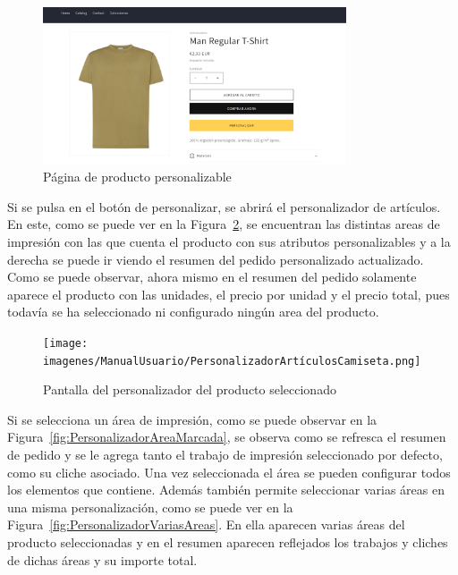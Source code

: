 \documentclass[12pt]{article}
\begin{document}
\begin{figure}[ht]
    \centering
    \includegraphics[width=0.8\textwidth]{imagenes/ManualUsuario/PaginaProductoConPersonalizacion.png}
    \caption{\label{fig:ProductoPersonalizable}Página de producto personalizable}
    \vspace{\fill}
\end{figure}

Si se pulsa en el botón de personalizar, se abrirá el personalizador de artículos. En este, como se puede ver en la Figura~\ref{fig:Personalizador}, se encuentran
las distintas areas de impresión con las que cuenta el producto con sus atributos personalizables y a la derecha se puede ir viendo el resumen del pedido personalizado actualizado.
Como se puede observar, ahora mismo en el resumen del pedido solamente aparece el producto con las unidades, el precio por unidad y el precio total, pues todavía se ha seleccionado ni configurado
ningún area del producto.

\begin{figure}[ht]
    \centering
    \texttt{[image: imagenes/ManualUsuario/PersonalizadorArtículosCamiseta.png]}
    \caption{\label{fig:Personalizador}Pantalla del personalizador del producto seleccionado}
    \vspace{\fill}
\end{figure}

Si se selecciona un área de impresión, como se puede observar en la Figura~\ref{fig:PersonalizadorAreaMarcada}, se observa como se refresca el resumen de pedido y se le agrega tanto el trabajo de impresión
seleccionado por defecto, como su cliche asociado. Una vez seleccionada el área se pueden configurar todos los elementos que contiene. Además también permite seleccionar varias áreas en una misma personalización, como 
se puede ver en la Figura~\ref{fig:PersonalizadorVariasAreas}. En ella aparecen varias áreas del producto seleccionadas y en el resumen aparecen reflejados los trabajos y cliches de dichas áreas y su importe total.
\end{document}
